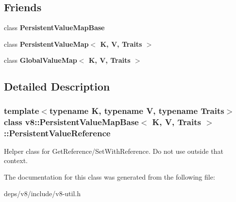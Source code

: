 \subsection*{Friends}
\begin{DoxyCompactItemize}
\item 
\hypertarget{classv8_1_1_persistent_value_map_base_1_1_persistent_value_reference_ae5cccd63ef6d94c509ad8b6970d4017d}{}class {\bfseries Persistent\+Value\+Map\+Base}\label{classv8_1_1_persistent_value_map_base_1_1_persistent_value_reference_ae5cccd63ef6d94c509ad8b6970d4017d}

\item 
\hypertarget{classv8_1_1_persistent_value_map_base_1_1_persistent_value_reference_a22fcaa9f3ba179f3bb566eda5b93790d}{}class {\bfseries Persistent\+Value\+Map$<$ K, V, Traits $>$}\label{classv8_1_1_persistent_value_map_base_1_1_persistent_value_reference_a22fcaa9f3ba179f3bb566eda5b93790d}

\item 
\hypertarget{classv8_1_1_persistent_value_map_base_1_1_persistent_value_reference_a41811cde55d1ef227d1ba28778d95d08}{}class {\bfseries Global\+Value\+Map$<$ K, V, Traits $>$}\label{classv8_1_1_persistent_value_map_base_1_1_persistent_value_reference_a41811cde55d1ef227d1ba28778d95d08}

\end{DoxyCompactItemize}


\subsection{Detailed Description}
\subsubsection*{template$<$typename K, typename V, typename Traits$>$class v8\+::\+Persistent\+Value\+Map\+Base$<$ K, V, Traits $>$\+::\+Persistent\+Value\+Reference}

Helper class for Get\+Reference/\+Set\+With\+Reference. Do not use outside that context. 

The documentation for this class was generated from the following file\+:\begin{DoxyCompactItemize}
\item 
deps/v8/include/v8-\/util.\+h\end{DoxyCompactItemize}
